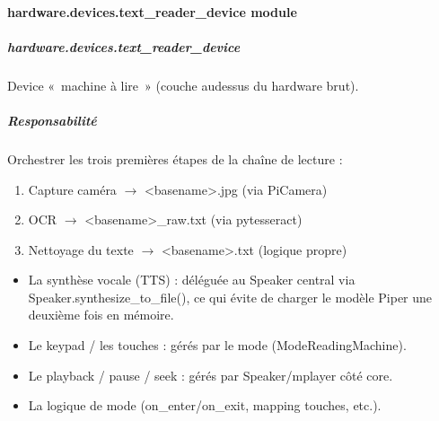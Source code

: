 \documentclass[letterpaper,10pt,french]{sphinxmanual}
\begin{document}
\paragraph{hardware.devices.text\_reader\_device module}
\label{\detokenize{api/hardware.devices:module-hardware.devices.text_reader_device}}\label{\detokenize{api/hardware.devices:hardware-devices-text-reader-device-module}}

\subparagraph{hardware.devices.text\_reader\_device}
\label{\detokenize{api/hardware.devices:hardware-devices-text-reader-device}}
\sphinxAtStartPar
Device « machine à lire » (couche au\sphinxhyphen{}dessus du hardware brut).


\subparagraph{Responsabilité}
\label{\detokenize{api/hardware.devices:responsabilite}}
\sphinxAtStartPar
Orchestrer les trois premières étapes de la chaîne de lecture :
\begin{enumerate}
%
\item {} 
\sphinxAtStartPar
Capture caméra       \(\rightarrow\) \textless{}basename\textgreater{}.jpg          (via PiCamera)

\item {} 
\sphinxAtStartPar
OCR                  \(\rightarrow\) \textless{}basename\textgreater{}\_raw.txt       (via pytesseract)

\item {} 
\sphinxAtStartPar
Nettoyage du texte   \(\rightarrow\) \textless{}basename\textgreater{}.txt           (logique propre)

\end{enumerate}
\begin{description}
\begin{itemize}
\item {} 
\sphinxAtStartPar
La synthèse vocale (TTS) : déléguée au Speaker central via
Speaker.synthesize\_to\_file(), ce qui évite de charger le modèle
Piper une deuxième fois en mémoire.

\item {} 
\sphinxAtStartPar
Le keypad / les touches : gérés par le mode (ModeReadingMachine).

\item {} 
\sphinxAtStartPar
Le playback / pause / seek : gérés par Speaker/mplayer côté core.

\item {} 
\sphinxAtStartPar
La logique de mode (on\_enter/on\_exit, mapping touches, etc.).

\end{itemize}

\end{description}
\end{document}
